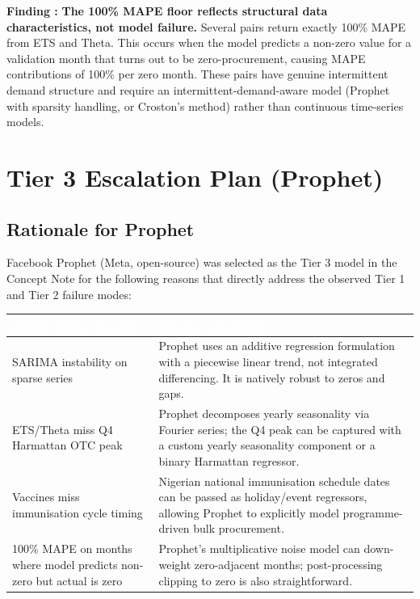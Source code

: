 \documentclass[12pt, a4paper]{article}
\newcounter{finding}
\newcommand{\finding}[1]{%
  \stepcounter{finding}%
  \begin{mdframed}[style=greenbox]
  \textbf{Finding \thefinding:} #1
  \end{mdframed}%
}
\begin{document}
\finding{%
  \textbf{The 100\% MAPE floor reflects structural data characteristics, not
  model failure.} Several pairs return exactly 100\% MAPE from ETS and Theta.
  This occurs when the model predicts a non-zero value for a validation month
  that turns out to be zero-procurement, causing MAPE contributions of
  100\% per zero month. These pairs have genuine intermittent demand structure
  and require an intermittent-demand-aware model (Prophet with sparsity
  handling, or Croston's method) rather than continuous time-series models.
}

\section{Tier 3 Escalation Plan (Prophet)}

\subsection{Rationale for Prophet}

Facebook Prophet (Meta, open-source) was selected as the Tier 3 model
in the Concept Note for the following reasons that directly address the
observed Tier 1 and Tier 2 failure modes:

\vspace{0.5em}
\noindent
\begin{tabularx}{\textwidth}{@{} L{4cm} X @{}}
  \toprule
  \textcolor{white}{\textbf{Failure mode (T1/T2)}} &
  \textcolor{white}{\textbf{Prophet capability}} \\
  \midrule
  SARIMA instability on sparse series &
    Prophet uses an additive regression formulation with a piecewise linear
    trend, not integrated differencing. It is natively robust to zeros and
    gaps. \\
  ETS/Theta miss Q4 Harmattan OTC peak &
    Prophet decomposes yearly seasonality via Fourier series; the Q4 peak
    can be captured with a custom yearly seasonality component or a binary
    Harmattan regressor. \\
  Vaccines miss immunisation cycle timing &
    Nigerian national immunisation schedule dates can be passed as
    holiday/event regressors, allowing Prophet to explicitly model
    programme-driven bulk procurement. \\
  100\% MAPE on months where model predicts non-zero but actual is zero &
    Prophet's multiplicative noise model can down-weight zero-adjacent
    months; post-processing clipping to zero is also straightforward. \\
  \bottomrule
\end{tabularx}
\end{document}
